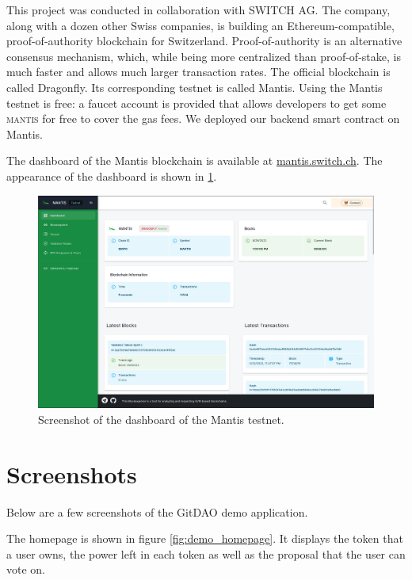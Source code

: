 This project was conducted in collaboration with SWITCH AG.
The company, along with a dozen other Swiss companies, is building an Ethereum-compatible, proof-of-authority blockchain for Switzerland.
Proof-of-authority is an alternative consensus mechanism, which, while being more centralized than proof-of-stake, is much faster and allows much larger transaction rates.
The official blockchain is called Dragonfly.
Its corresponding testnet is called Mantis.
Using the Mantis testnet is free: a faucet account is provided that allows developers to get some \textsc{mantis} for free to cover the gas fees.
We deployed our backend smart contract on Mantis.

The dashboard of the Mantis blockchain is available at \href{https://mantis.switch.ch/dashboard/}{mantis.switch.ch}.
The appearance of the dashboard is shown in \cref{fig:mantis_dashboard}.

\begin{figure}[ht!]
  \includegraphics[width=\linewidth]{images/mantis_dashboard.png}%
  \caption{\label{fig:mantis_dashboard}Screenshot of the dashboard of the Mantis testnet.}
\end{figure}

\section{Screenshots}

Below are a few screenshots of the GitDAO demo application.

The homepage is shown in figure \cref{fig:demo_homepage}.
It displays the token that a user owns, the power left in each token as well as the proposal that the user can vote on.

